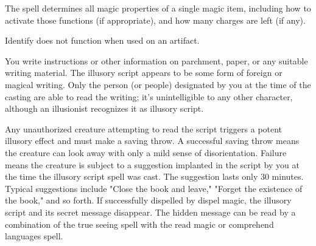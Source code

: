\begin{multicols}{2}
\begin{small}

\noindent The spell determines all magic properties of a single magic item, including how to activate those functions (if appropriate), and how many charges are left (if any).

\smallskip\noindent Identify does not function when used on an artifact.


\noindent You write instructions or other information on parchment, paper, or any suitable writing material. The illusory script appears to be some form of foreign or magical writing. Only the person (or people) designated by you at the time of the casting are able to read the writing; it's unintelligible to any other character, although an illusionist recognizes it as illusory script.

\smallskip\noindent Any unauthorized creature attempting to read the script triggers a potent illusory effect and must make a saving throw. A successful saving throw means the creature can look away with only a mild sense of disorientation. Failure means the creature is subject to a suggestion implanted in the script by you at the time the illusory script spell was cast. The suggestion lasts only 30 minutes. Typical suggestions include "Close the book and leave," "Forget the existence of the book," and so forth. If successfully dispelled by dispel magic, the illusory script and its secret message disappear. The hidden message can be read by a combination of the true seeing spell with the read magic or comprehend languages spell.


\end{small}
\end{multicols}

